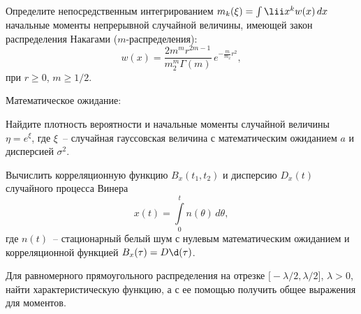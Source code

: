 \documentclass[pscyr]{hedwork}
\begin{document}
  \maketitle

  \begin{task}{6}{
    Определите непосредственным интегрированием
    \( m_k(\xi) = \int\lii x^k w(x)\,dx \) начальные моменты непрерывной
    случайной величины, имеющей закон распределения Накагами
    (\( m \)-распределения):
    \[
      w(x) = \frac{2m^m r^{2m - 1}}{m_2^m\Gamma(m)}\,e^{-\frac{m}{m_2}r^2},
    \]
    при \( r \ge 0 \), \( m \ge 1 / 2 \).
  }

    Математическое ожидание:
  \end{task}

  \begin{task}{16}{
    Найдите плотность вероятности и начальные моменты случайной величины
    \( \eta = e^\xi \), где \( \xi \)~-- случайная гауссовская величина с
    математическим ожиданием \( a \) и дисперсией \( \sigma^2 \).
  }
    
  \end{task}
  
  \begin{task}{39}{
    Вычислить корреляционную функцию \( B_x(t_1, t_2) \) и дисперсию
    \( D_x(t) \) случайного процесса Винера
    \[
      x(t) = \int\limits_0^t n(\theta)\,d\theta,
    \]
    где \( n(t) \)~-- стационарный белый шум с нулевым математическим ожиданием
    и корреляционной функцией \( B_x(\tau) = D\d(\tau) \).
  }
  
  \end{task}
  
  \begin{task*}{49}{
    Для равномерного прямоугольного распределения на отрезке
    \( \bigl[-\lambda / 2, \lambda / 2 \big] \), \( \lambda > 0 \), найти
    характеристическую функцию, а с ее помощью получить общее выражения для
    моментов.
  }
  
  \end{task*}
\end{document}

